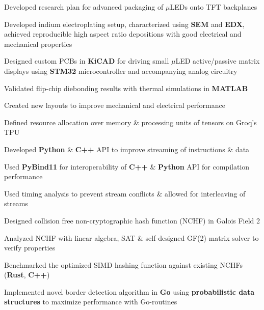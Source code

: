 \documentclass[]{chandan-cv}
\begin{document}
\begin{minipage}[t]{0.78\textwidth}
\begin{tightemize}
        \item Developed research plan for advanced packaging of $\mu$LEDs onto TFT backplanes
		\item Developed indium electroplating setup, characterized using \textbf{SEM} and \textbf{EDX}, achieved reproducible high aspect ratio depositions with good electrical and mechanical properties 
		\item Designed custom PCBs in \textbf{KiCAD} for driving small $\mu$LED active/passive matrix displays using \textbf{STM32} microcontroller and accompanying analog circuitry
		\item Validated flip-chip diebonding results with thermal simulations in \textbf{MATLAB}
		\item Created new layouts to improve mechanical and electrical performance 
\end{tightemize}
\sectionsep

\begin{tightemize}
        \item Defined resource allocation over memory \& processing units of tensors on Groq's TPU
        \item Developed \textbf{Python} \& \textbf{C++} API to improve streaming of instructions \& data
        \item Used \textbf{PyBind11} for interoperability of \textbf{C++} \& \textbf{Python} API for compilation performance 
        \item Used timing analysis to prevent stream conflicts \& allowed for interleaving of streams
\end{tightemize}
\sectionsep

\begin{tightemize}
        \item Designed collision free non-cryptographic hash function (NCHF) in Galois Field 2
        \item Analyzed NCHF with linear algebra, SAT \& self-designed GF(2) matrix solver to verify properties
        \item Benchmarked the optimized SIMD hashing function against existing NCHFs (\textbf{Rust}, \textbf{C++})
        \item Implemented novel border detection algorithm in \textbf{Go} using \textbf{probabilistic data structures} to maximize performance with Go-routines
\end{tightemize}
\sectionsep


\end{minipage}
\end{document}
